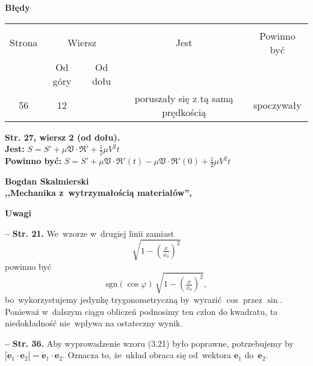\documentclass[a4paper,11pt]{article}
\newcommand{\tb}{\textbf}
\newcommand{\noi}{\noindent}
\newcommand{\tb}{\textbf}
\newcommand{\noi}{\noindent}
\newcommand{\start}{\noi \tb{--} {}}
\newcommand{\Str}[1]{\tb{Str. #1.}}
\newcommand{\StrWd}[2]{\tb{Str. #1, wiersz #2 (od dołu).}}
\newcommand{\Jest}{\tb{Jest: }}
\newcommand{\Pow}{\tb{Powinno być: }}
\newcommand{\Center}[1]{\begin{center} #1 \end{center}}
\newcommand{\CenterTB}[1]{\Center{\tb{#1}}}
\newcommand{\Work}[1]{ \begin{center} {\large \tb{#1}} \end{center} }
\newcommand{\fr}{\frac}
\newcommand{\mf}{\mathfrak}
\newcommand{\Jest}{\tb{Jest: }}
\newcommand{\Pow}{\tb{Powinno być: }}
\newcommand{\Work}[1]{ \begin{center} {\large \tb{#1}} \end{center} }
\newcommand{\fr}{\frac}
\newcommand{\mf}{\mathfrak}
\newcommand{\tb}{\textbf}
\newcommand{\noi}{\noindent}
\newcommand{\start}{\noi \tb{--} {}}
\newcommand{\Str}[1]{\tb{Str. #1.}}
\newcommand{\StrWd}[2]{\tb{Str. #1, wiersz #2 (od dołu).}}
\newcommand{\Center}[1]{\begin{center} #1 \end{center}}
\newcommand{\CenterTB}[1]{\Center{\tb{#1}}}
\newcommand{\Jest}{\tb{Jest: }}
\newcommand{\Pow}{\tb{Powinno być: }}
\newcommand{\Work}[1]{ \begin{center} {\large \tb{#1}} \end{center} }
\newcommand{\bd}[1]{\boldsymbol{#1}}
\newcommand{\eb}{\bd{e}} %
\begin{document}
\CenterTB{Błędy}
\begin{center}
  \begin{tabular}{|c|c|c|c|c|}
    \hline
    & \multicolumn{2}{c|}{} & & \\
    Strona & \multicolumn{2}{c|}{Wiersz} & Jest & Powinno być \\ \cline{2-3}
    & Od góry & Od dołu &  &  \\ \hline
    56 & 12 & & poruszały się z tą samą prędkością & spoczywały \\
    \hline
  \end{tabular}
\end{center}
\noi
\StrWd{27}{2} \\
\Jest $S = S' + \mu \mf{V} \cdot \mf{R}' + \fr{ 1 }{ 2 } \mu V^{ 2 } t$ \\
\Pow $S = S' + \mu \mf{V} \cdot \mf{R}'( t ) - \mu \mf{V} \cdot
\mf{R}'( 0 ) + \fr{ 1 }{ 2 } \mu V^{ 2 } t$ \\





\Work{
  Bogdan Skalmierski \\
  ,,Mechanika z~wytrzymałością materiałów'', \cite{Ska83} }


\CenterTB{Uwagi}

\start \Str{21} We~wzorze w~drugiej linii zamiast
\begin{displaymath}
  \sqrt{1 - \left( \tfrac{ x }{ x_{ 0 } } \right)^{ 2 } }
\end{displaymath}
powinno być
\begin{displaymath}
  \mathrm{sgn}( \cos \varphi ) \, \sqrt{1 - \left( \tfrac{ x }{ x_{ 0 } }
    \right)^{ 2 } },
\end{displaymath}
bo~wykorzystujemy jedynkę trygonometryczną by~wyrazić $\cos$ przez
$\sin$. Ponieważ w~dalszym ciągu obliczeń podnosimy ten człon do
kwadratu, ta niedokładność nie~wpływa na ostateczny wynik.

\start \Str{36} Aby wyprowadzenie wzoru (3.21) było poprawne,
potrzebujemy by
$| \dot{ \eb }_{ 1 } \cdot \eb_{ 2 } | = \dot{ \eb }_{ 1 } \cdot
\eb_{ 2 }$. Oznacza to, że~układ obraca się od~wektora $\eb_{ 1 }$
do~$\eb_{ 2 }$.
\end{document}

